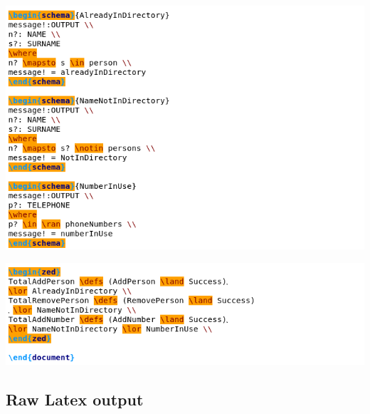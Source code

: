 \noindent \includegraphics[scale=0.5]{examples/nonworkzcga/0imaged.png}

\noindent \includegraphics[scale=0.5]{examples/nonworkzcga/0imagee.png}

%
\subsection{Raw Latex output}

